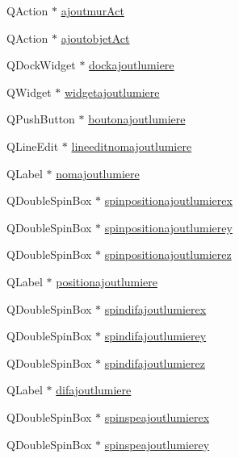 \begin{DoxyCompactItemize}
\item 
Q\+Action $\ast$ \hyperlink{class_main_window_ad2fca762b760f8d9dd224c820a188623}{ajoutmur\+Act}
\item 
Q\+Action $\ast$ \hyperlink{class_main_window_a4a661ddac989853564e72a960e4f5e79}{ajoutobjet\+Act}
\item 
Q\+Dock\+Widget $\ast$ \hyperlink{class_main_window_a391dd00592f215079a80db989f24266e}{dockajoutlumiere}
\item 
Q\+Widget $\ast$ \hyperlink{class_main_window_a9e2c8a96b09dbbfaa041531420603b9e}{widgetajoutlumiere}
\item 
Q\+Push\+Button $\ast$ \hyperlink{class_main_window_a4f7a42439a3d1dbc5213e5d2282f5ab0}{boutonajoutlumiere}
\item 
Q\+Line\+Edit $\ast$ \hyperlink{class_main_window_a88ef14a32e7bd0694d8c970b700588c8}{lineeditnomajoutlumiere}
\item 
Q\+Label $\ast$ \hyperlink{class_main_window_ad38c142eee23820d2d4c87217ea3558a}{nomajoutlumiere}
\item 
Q\+Double\+Spin\+Box $\ast$ \hyperlink{class_main_window_a5286af2240735027e43e96856889ba2d}{spinpositionajoutlumierex}
\item 
Q\+Double\+Spin\+Box $\ast$ \hyperlink{class_main_window_af8f989d61672591976f45a3857bd4088}{spinpositionajoutlumierey}
\item 
Q\+Double\+Spin\+Box $\ast$ \hyperlink{class_main_window_a190e482131a28865d5cb0956a1149272}{spinpositionajoutlumierez}
\item 
Q\+Label $\ast$ \hyperlink{class_main_window_a3c50fe103c1d0f1278737bced7e2e452}{positionajoutlumiere}
\item 
Q\+Double\+Spin\+Box $\ast$ \hyperlink{class_main_window_a0c740f449736ce6c303b0675f954f050}{spindifajoutlumierex}
\item 
Q\+Double\+Spin\+Box $\ast$ \hyperlink{class_main_window_ae03c85b751d4a28e2916e66d82d7e72d}{spindifajoutlumierey}
\item 
Q\+Double\+Spin\+Box $\ast$ \hyperlink{class_main_window_afca1245690133c96c9e182b0b56c6006}{spindifajoutlumierez}
\item 
Q\+Label $\ast$ \hyperlink{class_main_window_a87d3bd68a5f4e2323110804c4111dcc9}{difajoutlumiere}
\item 
Q\+Double\+Spin\+Box $\ast$ \hyperlink{class_main_window_a433afe9bb63e53ccf2253eb39ee6ebd1}{spinspeajoutlumierex}
\item 
Q\+Double\+Spin\+Box $\ast$ \hyperlink{class_main_window_afd72a5b29130fa092fdb6cb9b05f937c}{spinspeajoutlumierey}

\end{DoxyCompactItemize}

